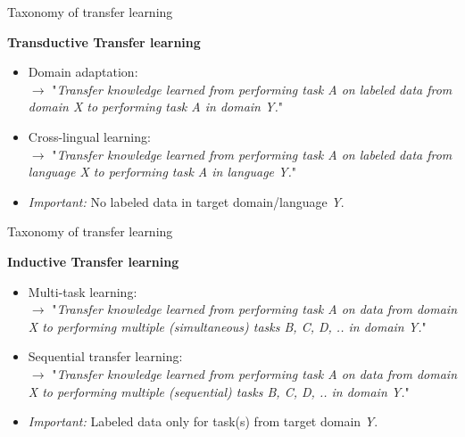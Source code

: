 \begin{frame}{Taxonomy of transfer learning \href{https://ruder.io/thesis/}{}}

\vfill

	\textbf{Transductive Transfer learning}

	\begin{itemize}
		\item Domain adaptation:\\
					$\rightarrow$ "\textit{Transfer knowledge learned from performing task A on labeled data from domain X to performing task A in domain Y.}"\\\mbox{}
		\item Cross-lingual learning:\\
					$\rightarrow$ "\textit{Transfer knowledge learned from performing task A on labeled data from language X to performing task A in language Y.}"\\\mbox{}
		\item \textit{Important:} No labeled data in target domain/language \textit{Y}.
	\end{itemize}
	
\vfill

\end{frame}


\begin{frame}{Taxonomy of transfer learning \href{https://ruder.io/thesis/}{}}

\vfill

	\textbf{Inductive Transfer learning}

	\begin{itemize}
		\item Multi-task learning:\\
					$\rightarrow$ "\textit{Transfer knowledge learned from performing task A on data from domain X to performing multiple (simultaneous) tasks B, C, D, .. in domain Y.}"\\\mbox{}
		\item Sequential transfer learning:\\
					$\rightarrow$ "\textit{Transfer knowledge learned from performing task A on data from domain X to performing multiple (sequential) tasks B, C, D, .. in domain Y.}"\\\mbox{}
		\item \textit{Important:} Labeled data only for task(s) from target domain \textit{Y}.
	\end{itemize}
	
\vfill

\end{frame}

